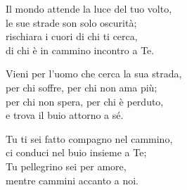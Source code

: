
 

\spazio

\strofa Il mondo attende la luce del tuo volto,\\
le sue strade son solo oscurità;\\
rischiara i cuori di chi ti cerca,\\
di chi è in cammino incontro a Te.

\spazio


\spazio

\strofa Vieni per l'uomo che cerca la sua strada,\\
per chi soffre, per chi non ama più;\\
per chi non spera, per chi è perduto,\\
e trova il buio attorno a sé.

\spazio


\spazio

\strofa Tu ti sei fatto compagno nel cammino,\\
ci conduci nel buio insieme a Te;\\
Tu pellegrino sei per amore,\\
mentre cammini accanto a noi.

\spazio

 